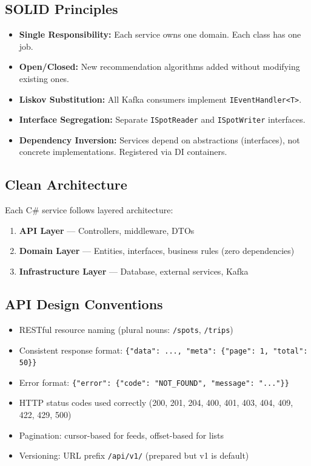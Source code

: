 \documentclass[12pt,letterpaper]{article}
\begin{document}
\subsection{SOLID Principles}
\begin{itemize}
  \item \textbf{Single Responsibility:} Each service owns one domain. Each class has one job.
  \item \textbf{Open/Closed:} New recommendation algorithms added without modifying existing ones.
  \item \textbf{Liskov Substitution:} All Kafka consumers implement \texttt{IEventHandler<T>}.
  \item \textbf{Interface Segregation:} Separate \texttt{ISpotReader} and \texttt{ISpotWriter} interfaces.
  \item \textbf{Dependency Inversion:} Services depend on abstractions (interfaces), not concrete implementations. Registered via DI containers.
\end{itemize}

\subsection{Clean Architecture}
Each C\# service follows layered architecture:
\begin{enumerate}
  \item \textbf{API Layer} --- Controllers, middleware, DTOs
  \item \textbf{Domain Layer} --- Entities, interfaces, business rules (zero dependencies)
  \item \textbf{Infrastructure Layer} --- Database, external services, Kafka
\end{enumerate}

\subsection{API Design Conventions}
\begin{itemize}
  \item RESTful resource naming (plural nouns: \texttt{/spots}, \texttt{/trips})
  \item Consistent response format: \texttt{\{"data": ..., "meta": \{"page": 1, "total": 50\}\}}
  \item Error format: \texttt{\{"error": \{"code": "NOT\_FOUND", "message": "..."\}\}}
  \item HTTP status codes used correctly (200, 201, 204, 400, 401, 403, 404, 409, 422, 429, 500)
  \item Pagination: cursor-based for feeds, offset-based for lists
  \item Versioning: URL prefix \texttt{/api/v1/} (prepared but v1 is default)
\end{itemize}
\end{document}
